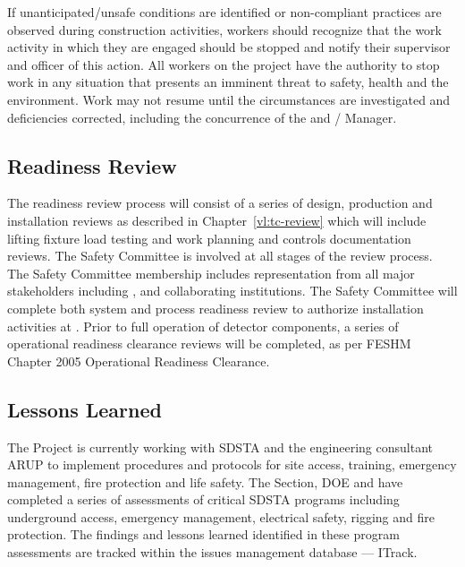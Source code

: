 If unanticipated/unsafe conditions are identified or non-compliant
practices are observed during construction activities, workers should
recognize that the work activity in which they are engaged should be
stopped and notify their supervisor and  officer of
this action. All workers on the  project have the
authority to stop work in any situation that presents an imminent
threat to safety, health and the environment. Work may not resume
until the circumstances are investigated and deficiencies corrected,
including the concurrence of the  
and /  Manager.

\subsection{ Readiness Review}

The  readiness review process will consist of a series of
design, production and installation reviews as described in
Chapter~\ref{vl:tc-review} which will include lifting fixture load
testing and work planning and controls documentation reviews. The
 Safety Committee is involved at all stages of the review
process.  The  Safety Committee membership includes
representation from all major stakeholders including \fnal,  and
 collaborating institutions. The  Safety
Committee will complete both system and process readiness review to
authorize installation activities at .  Prior to full operation
of detector components, a series of operational readiness clearance
reviews will be completed, as per FESHM Chapter 2005 Operational
Readiness Clearance.

\subsection{Lessons Learned}

The  Project is currently working with SDSTA and the 
engineering consultant ARUP to implement  procedures and
protocols for site access, training, emergency management, fire
protection and life safety. The \fnal {} Section, DOE and
  have completed a series of assessments of
critical SDSTA  programs including underground access,
emergency management, electrical safety, rigging and fire
protection. The findings and lessons learned identified in these
 program assessments are tracked within the \fnal issues management
database --- ITrack.

